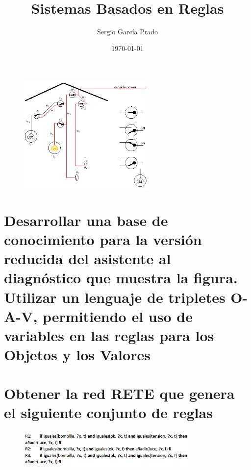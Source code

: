 \documentclass[10pt, a4paper,spanish]{article}
\title{\vspace{-15mm}\fontsize{24pt}{10pt}\selectfont\textbf{Sistemas Basados en Reglas}} %
\author{Sergio García Prado}
\date{\today}
\begin{document}
	\maketitle %

	\thispagestyle{fancy} %


	\begin{figure}[H]
		\begin{center}
			\includegraphics[width=0.6\textwidth]{diagnostic-assistant}
		\end{center}
	\end{figure}


	\section{Desarrollar una base de conocimiento para la versión reducida del asistente al diagnóstico que muestra la figura. Utilizar un lenguaje de tripletes O-A-V, permitiendo el uso de variables en las reglas para los Objetos y los Valores}

		\paragraph{}


	\section{Obtener la red RETE que genera el siguiente conjunto de reglas}

	\begin{figure}[H]
		\begin{center}
			\includegraphics[width=0.8\textwidth]{rete-exercise}
		\end{center}
	\end{figure}
\end{document}
